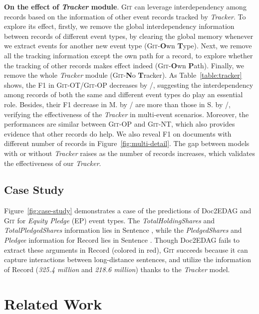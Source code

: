 \documentclass[11pt,a4paper]{article}
\newcommand{\modelname}{\textsc{Git}\xspace}
\begin{document}
\textbf{On the effect of \textit{Tracker} module}.
\modelname can leverage interdependency among records based on the information of other event records tracked by \textit{Tracker}.
To explore its effect, firstly, we remove the global interdependency information between records of different event types, by clearing the global memory whenever we extract events for another new event type (\modelname-\textbf{O}wn \textbf{T}ype).
Next, we remove all the tracking information except the own path for a record, to explore whether the tracking of other records makes effect indeed (\modelname-\textbf{O}wn \textbf{P}ath).
Finally, we remove the whole \textit{Tracker} module (\modelname-\textbf{N}o \textbf{T}racker).
As Table~\ref{table:tracker} shows, the F1 in \modelname-OT/\modelname-OP decreases by /, suggesting the interdependency among records of both the same and different event types do play an essential role.
Besides, their F1 decrease in M. by / are more than those in S. by /, verifying the effectiveness of the \textit{Tracker} in multi-event scenarios.
Moreover, the performances are similar between \modelname-OP and \modelname-NT, which also provides evidence that other records do help.
We also reveal F1 on documents with different number of records in Figure~\ref{fig:multi-detail}.
The gap between models with or without \textit{Tracker} raises as the number of records increases, which validates the effectiveness of our \textit{Tracker}. 


\subsection{Case Study}
Figure~\ref{fig:case-study} demonstrates a case of the predictions of Doc2EDAG and \modelname for \textit{Equity Pledge} (EP) event types.
The \textit{TotalHoldingShares} and \textit{TotalPledgedShares} information lies in Sentence , while the \textit{PledgedShares} and \textit{Pledgee} information for Record  lies in Sentence .
Though Doc2EDAG fails to extract these arguments in Record  (colored in red), \modelname succeeds because it can capture interactions between long-distance sentences, and utilize the information of Record  (\textit{325.4 million} and \textit{218.6 million}) thanks to the \textit{Tracker} model. \section{Related Work}
\end{document}
